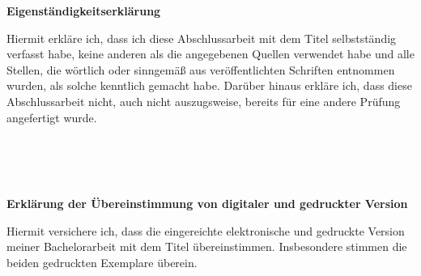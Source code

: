 \documentclass[12pt,a4paper,twoside]{amsart}  %
\theoremstyle{plain}
\theoremstyle{definition}
\theoremstyle{remark}
\numberwithin{equation}{section} %
\begin{document}
	\begin{center}
		\textbf{Eigenständigkeitserklärung}
	\end{center}
	Hiermit erkläre ich, dass ich diese Abschlussarbeit mit dem Titel \grqq{} selbstständig verfasst habe, keine anderen als die angegebenen Quellen verwendet habe und alle Stellen, die wörtlich oder sinngemäß aus veröffentlichten Schriften entnommen wurden, als solche kenntlich gemacht habe. Darüber hinaus erkläre ich, dass diese Abschlussarbeit nicht, auch nicht auszugsweise, bereits für eine andere Prüfung angefertigt wurde. \\
	\\
	\begin{flushleft}
		\makebox[.4\textwidth]{\hrulefill}\hfill \makebox[.4\textwidth]{\hrulefill}\\
		\hfill
		\\
	\end{flushleft}
	
	\vspace{3cm}
	
	\begin{center}
		\textbf{Erklärung der Übereinstimmung von digitaler und gedruckter Version}
	\end{center}
	Hiermit versichere ich, dass die eingereichte elektronische und gedruckte Version meiner Bachelorarbeit mit dem Titel \grqq{} über\-ein\-stim\-men. Insbesondere stimmen die beiden gedruckten Exemplare überein. \\
	
	\begin{flushleft}
		\makebox[.4\textwidth]{\hrulefill}\hfill \makebox[.4\textwidth]{\hrulefill}\\
		\hfill
		\makebox[.4\textwidth]{Vorname Nachname}\\
	\end{flushleft}
\end{document}
